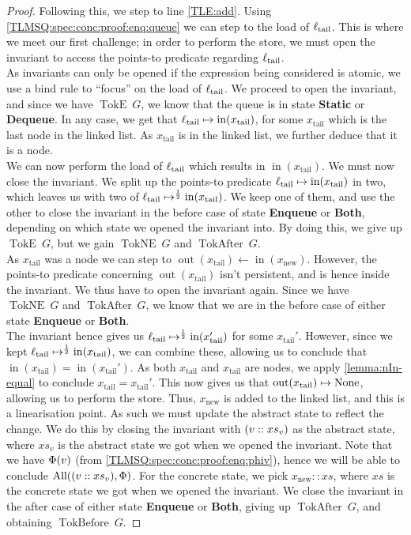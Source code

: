 \documentclass[a4paper, 10pt]{report}
\theoremstyle{definition}
\newcommand{\xsc}{xs}
\newcommand{\AllP}{\operatorname{All}}
\newcommand{\locN}[1]{\loc_{\mathrm{#1}}}
\newcommand{\loctail}{\locN{tail}}
\newcommand{\nIn}[1]{\operatorname{in}(#1)}
\newcommand{\nOut}[1]{\operatorname{out}(#1)}
\newcommand{\node}{x}
\newcommand{\nodeN}[1]{\node_{\mathrm{#1}}}
\newcommand{\nodetail}{\nodeN{tail}}
\newcommand{\nodenew}{\nodeN{new}}
\newcommand{\absvalue}{\val}
\newcommand{\absvalueList}{xs_v}
\newcommand{\StaticState}{\textbf{Static}\xspace}
\newcommand{\EnqueueState}{\textbf{Enqueue}\xspace}
\newcommand{\DequeueState}{\textbf{Dequeue}\xspace}
\newcommand{\BothState}{\textbf{Both}\xspace}
\newcommand{\Qg}{G}
\newcommand{\TokE}[1]{\operatorname{TokE} ~ #1}
\newcommand{\TokEQg}{\TokE{\Qg}}
\newcommand{\TokNE}[1]{\operatorname{TokNE} ~ #1}
\newcommand{\TokNEQg}{\TokNE{\Qg}}
\newcommand{\TokBefore}[1]{\operatorname{TokBefore} ~ #1}
\newcommand{\TokBeforeQg}{\TokBefore{\Qg}}
\newcommand{\TokAfter}[1]{\operatorname{TokAfter} ~ #1}
\newcommand{\TokAfterQg}{\TokAfter{\Qg}}
\begin{document}
\begin{proof}
Following this, we step to line \ref{TLE:add}. Using \ref{TLMSQ:spec:conc:proof:enq:queue} we can step to the load of $\loctail$. This is where we meet our first challenge; in order to perform the store, we must open the invariant to access the points-to predicate regarding $\loctail$.\\
As invariants can only be opened if the expression being considered is atomic, we use a bind rule to ``focus'' on the load of $\loctail$. We proceed to open the invariant, and since we have $\TokEQg$, we know that the queue is in state \StaticState or \DequeueState. In any case, we get that $\loctail \mapsto \nIn{\nodetail}$, for some $\nodetail$ which is the last node in the linked list. As $\nodetail$ is in the linked list, we further deduce that it is a node.\\
We can now perform the load of $\loctail$ which results in $\nIn{\nodetail}$. We must now close the invariant. We split up the points-to predicate $\loctail \mapsto \nIn{\nodetail}$ in two, which leaves us with two of $\loctail \mapsto^{\frac{1}{2}} \nIn{\nodetail}$. We keep one of them, and use the other to close the invariant in the before case of state \EnqueueState or \BothState, depending on which state we opened the invariant into. By doing this, we give up $\TokEQg$, but we gain $\TokNEQg$ and $\TokAfterQg$.\\
As $\nodetail$ was a node we can step to $\nOut{\nodetail} \gets \nIn{\nodenew}$. However, the points-to predicate concerning $\nOut{\nodetail}$ isn't persistent, and is hence inside the invariant. We thus have to open the invariant again. Since we have $\TokNEQg$ and $\TokAfterQg$, we know that we are in the before case of either state \EnqueueState or \BothState.\\
The invariant hence gives us $\loctail \mapsto^{\frac{1}{2}} \nIn{\nodetail'}$ for some $\nodetail'$. However, since we kept $\loctail \mapsto^{\frac{1}{2}} \nIn{\nodetail}$, we can combine these, allowing us to conclude that $\nIn{\nodetail} = \nIn{\nodetail'}$. As both $\nodetail$ and $\nodetail$ are nodes, we apply \ref{lemma:nIn-equal} to conclude $\nodetail = \nodetail'$. This now gives us that $\nOut{\nodetail} \mapsto \None$, allowing us to perform the store. Thus, $\nodenew$ is added to the linked list, and this is a linearisation point. As such we must update the abstract state to reflect the change. We do this by closing the invariant with $(\absvalue :: \absvalueList)$ as the abstract state, where $\absvalueList$ is the abstract state we got when we opened the invariant. Note that we have $\Phi(\absvalue)$ (from \ref{TLMSQ:spec:conc:proof:enq:phiv}), hence we will be able to conclude $\AllP((\absvalue :: \absvalueList), \Phi)$. For the concrete state, we pick $\nodenew :: \xsc$, where $\xsc$ is the concrete state we got when we opened the invariant. We close the invariant in the after case of either state \EnqueueState or \BothState, giving up $\TokAfterQg$, and obtaining $\TokBeforeQg$.


\end{proof}
\end{document}
